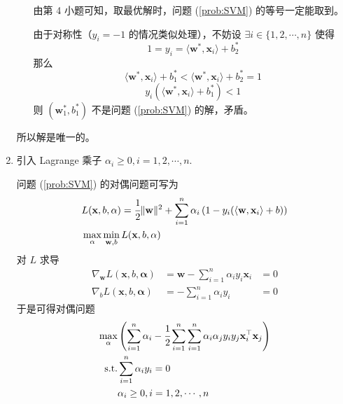 \documentclass[11pt,letter,notitlepage]{article}
\begin{document}
\begin{solution}
\begin{enumerate}
\begin{enumerate}
			            由第 4 小题可知，取最优解时，问题 (\ref{prob:SVM}) 的等号一定能取到。

			            由于对称性（$y_i=-1$ 的情况类似处理），不妨设 $\exists i \in \{1,2,\cdots,n\}$ 使得
			            $$1=y_i=\langle \mathbf{w}^*, \mathbf{x}_i \rangle+b_2^*$$
			            那么
			            $$\langle \mathbf{w}^*, \mathbf{x}_i \rangle+b_1^*
				            < \langle \mathbf{w}^*, \mathbf{x}_i \rangle+b_2^*
				            =1$$
			            $$y_i ( \langle \mathbf{w}^*, \mathbf{x}_i \rangle+b_1^*)<1$$
			            则 $(\mathbf{w}^*_1,b^*_1)$ 不是问题 (\ref{prob:SVM}) 的解，矛盾。
		      \end{enumerate}


		      所以解是唯一的。
		\item 引入 Lagrange 乘子 $\alpha_i \geq 0, i=1,2,\cdots,n$.

		      问题 (\ref{prob:SVM}) 的对偶问题可写为
		      $$\begin{aligned}
				       & L(\mathbf{x},b,\mathbf{\alpha}) = \cfrac{1}{2}\|\mathbf{w}\|^2 + \sum_{i=1}^{n}{\alpha_i \left( 1-y_i(\langle \mathbf{w},\mathbf{x}_i \rangle+b) \right)} \\
				       & \max_{\mathbf{\alpha}}\min_{\mathbf{w},b}L(\mathbf{x},b,\alpha)
			      \end{aligned}$$
		      对 $L$ 求导
		      $$\begin{aligned}
				      \nabla_{\mathbf{w}} L(\mathbf{x},b,\mathbf{\alpha}) & = \mathbf{w}-\sum_{i=1}^{n}{\alpha_i y_i \mathbf{x}_i} & =0 \\
				      \nabla_b L(\mathbf{x},b,\mathbf{\alpha})            & = -\sum_{i=1}^{n}{\alpha_i y_i}                        & =0
			      \end{aligned}$$
		      于是可得对偶问题
		      $$\begin{aligned}
				      \max_{\mathbf{\alpha}} & \left( \sum_{i=1}^{n}{\mathbf{\alpha}_i} - \cfrac{1}{2} \sum_{i=1}^{n}{\sum_{i=1}^{n}{\alpha_i \alpha_j y_i y_j \mathbf{x}_i^\top \mathbf{x}_j }}\right) \\
				      \text{s.t.}            & \sum_{i=1}^{n}{\alpha_i y_i}=0                                                                                                                           \\
				                             & \alpha_i \geq 0, i=1,2,\cdots,n
			      \end{aligned}$$
	\end{enumerate}
\end{solution}
\end{document}
